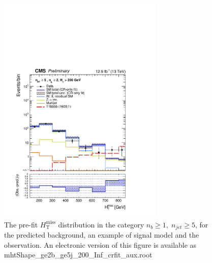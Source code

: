 \clearpage
\begin{figure}[tbhp]
    \caption{ 
    The pre-fit $H_{\mathrm{T}}^{\mathrm{miss}}$ distribution in the category $n_{b}\geq 1, \; n_{jet} \geq 5$, 
    for the predicted background, an example of signal model and the observation.
    An electronic version of this figure is available as mhtShape\_ge2b\_ge5j\_200\_Inf\_crfit\_aux.root
    \label{fig:mhtShape_ge2b_ge5j_crfit} }
  \begin{center}
  \includegraphics[width=0.7\textwidth]{mhtShape_ge2b_ge5j_200_Inf_crfit_aux}
  \end{center}
\end{figure}


